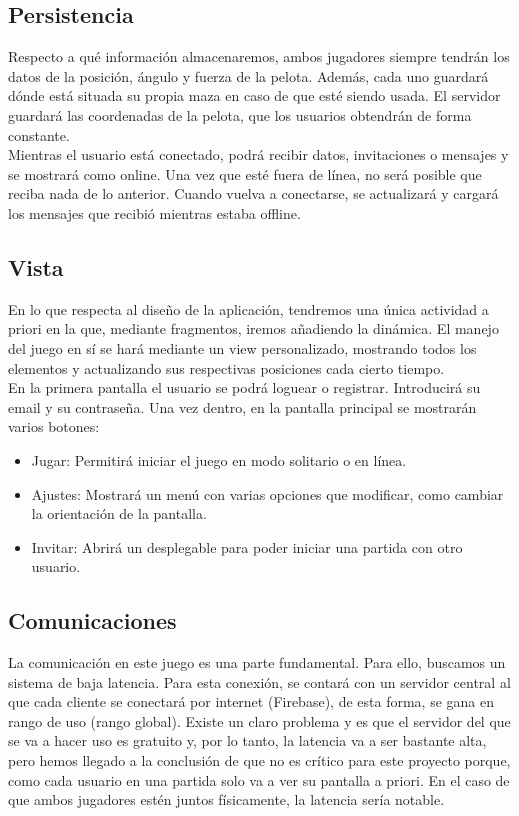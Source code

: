 \documentclass[a4paper,openright,12pt]{article}
\begin{document}
\subsection{Persistencia}
Respecto a qué información almacenaremos, ambos jugadores siempre tendrán los datos de la posición, ángulo y fuerza de la pelota. Además, cada uno guardará dónde está situada su propia maza en caso de que esté siendo usada. El servidor guardará las coordenadas de la pelota, que los usuarios obtendrán de forma constante. \\
Mientras el usuario está conectado, podrá recibir datos, invitaciones o mensajes y se mostrará como online. Una vez que esté fuera de línea, no será posible que reciba nada de lo anterior. Cuando vuelva a conectarse, se actualizará y cargará los mensajes que recibió mientras estaba offline.

\subsection{Vista}
En lo que respecta al diseño de la aplicación, tendremos una única actividad a priori en la que, mediante fragmentos, iremos añadiendo la dinámica. El manejo del juego en sí se hará mediante un view personalizado, mostrando todos los elementos y actualizando sus respectivas posiciones cada cierto tiempo. \\
En la primera pantalla el usuario se podrá loguear o registrar. Introducirá su email y su contraseña. Una vez dentro, en la pantalla principal se mostrarán varios botones: 
\begin{itemize}
    \item Jugar: Permitirá iniciar el juego en modo solitario o en línea.
    \item Ajustes: Mostrará un menú con varias opciones que modificar, como cambiar la orientación de la pantalla.
    \item Invitar: Abrirá un desplegable para poder iniciar una partida con otro usuario.
\end{itemize}


\subsection{Comunicaciones}
La comunicación en este juego es una parte fundamental. Para ello, buscamos un sistema de baja latencia. Para esta conexión, se contará con un servidor central al que cada cliente se conectará por internet (Firebase), de esta forma, se gana en rango de uso (rango global). Existe un claro problema y es que el servidor del que se va a hacer uso es gratuito y, por lo tanto, la latencia va a ser bastante alta, pero hemos llegado a la conclusión de que no es crítico para este proyecto porque, como cada usuario en una partida solo va a ver su pantalla a priori. En el caso de que ambos jugadores estén juntos físicamente, la latencia sería notable.
\end{document}
